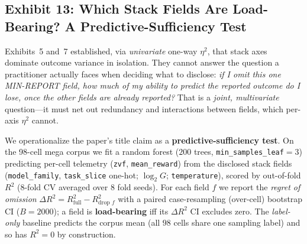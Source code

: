 \subsection{Exhibit 13: Which Stack Fields Are Load-Bearing? A Predictive-Sufficiency Test}
\label{sec:p5-exhibit-field-suff}
Exhibits~5 and~7 established, via \emph{univariate} one-way $\eta^{2}$, that
stack axes dominate outcome variance in isolation. They cannot answer the
question a practitioner actually faces when deciding what to disclose:
\emph{if I omit this one MIN-REPORT field, how much of my ability to predict
the reported outcome do I lose, once the other fields are already reported?}
That is a \emph{joint, multivariate} question---it must net out redundancy and
interactions between fields, which per-axis $\eta^{2}$ cannot.

We operationalize the paper's title claim as a \textbf{predictive-sufficiency
test}. On the 98-cell mega corpus we fit a random forest
($200$ trees, \texttt{min\_samples\_leaf}$=3$) predicting per-cell telemetry
(\texttt{zvf}, \texttt{mean\_reward}) from the disclosed stack fields
(\texttt{model\_family}, \texttt{task\_slice} one-hot; $\log_{2}G$;
\texttt{temperature}), scored by out-of-fold $R^{2}$ ($8$-fold CV averaged over
$8$ fold seeds). For each field $f$ we report the \emph{regret of omission}
$\Delta R^{2}=R^{2}_{\text{full}}-R^{2}_{\text{drop }f}$ with a paired
case-resampling (over-cell) bootstrap CI ($B{=}2000$); a field is
\textbf{load-bearing} iff its $\Delta R^{2}$ CI excludes zero. The
\emph{label-only} baseline predicts the corpus mean (all $98$ cells share one
sampling label) and so has $R^{2}=0$ by construction.

